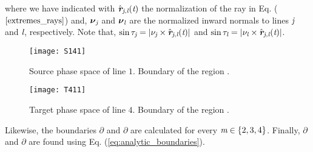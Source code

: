 where we have indicated with $\hat{\textit{\textbf{r}}}_{\textit{\textit{j}}, \textit{\textit{l}}}(\textit{t})$ the normalization of the ray in Eq. ($\ref{extremes_rays}$) and,
 $ \boldsymbol{\nu}_{\textit{\textit{j}}}$ and $\boldsymbol{\nu}_{\textit{\textit{l}}}$ are the normalized inward normals to lines $\textit{\textit{j}}$ and $\textit{\textit{l}}$, respectively.
 Note that,  $\sin{\tau_{\textit{\textit{j}}}} = |\nu_{\textit{\textit{j}}}\times \hat{\textit{\textbf{r}}}_{\textit{\textit{j}}, \textit{\textit{l}}}(\textit{t})|$ and $\sin{\tau_{\textit{\textit{l}}}} = |\nu_{\textit{\textit{l}}}\times \hat{\textit{\textbf{r}}}_{\textit{\textit{j}}, \textit{\textit{l}}}(\textit{t})|$.
 \begin{figure}
 \begin{minipage}[]{.48\textwidth}
   \centering
   \texttt{[image: S141]}
   \caption{Source phase space of line $1$.
   Boundary of the region .}
   \label{fig:S14}
 \end{minipage}\hfill
  \begin{minipage}[]{0.48\textwidth}
  \centering
   \texttt{[image: T411]}
   \caption{Target phase space of line $4$.
    Boundary of the region .}
    \label{fig:T411}
 \end{minipage}
 \end{figure}
 Likewise, the boundaries $\partial$ and
 $\partial$ are calculated for every $\textit{m}\in\{2,3,4\}$. Finally, $\partial$ and $\partial$ are found using Eq. (\ref{eq:analytic_boundaries}). \\
